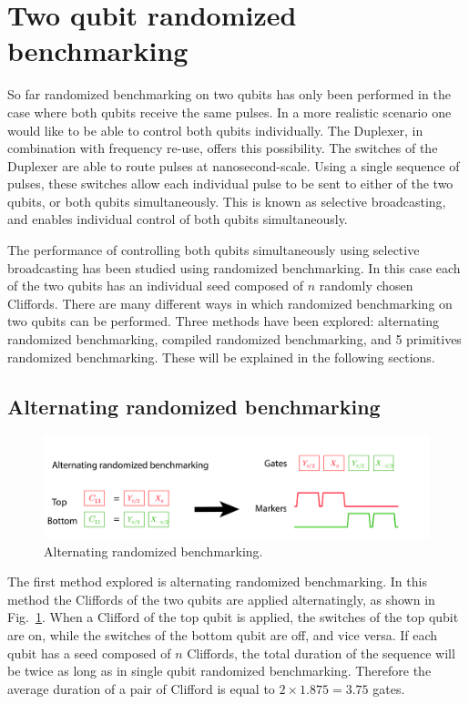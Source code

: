     \section{Two qubit randomized benchmarking}
      \label{Two qubit randomized benchmarking}
      So far randomized benchmarking on two qubits has only been performed in the case where both qubits receive the same pulses. In a more realistic scenario one would like to be able to control both qubits individually. The Duplexer, in combination with frequency re-use, offers this possibility. The switches of the Duplexer are able to route pulses at nanosecond-scale. Using a single sequence of pulses, these switches allow each individual pulse to be sent to either of the two qubits, or both qubits simultaneously. This is known as selective broadcasting, and enables individual control of both qubits simultaneously.

      The performance of controlling both qubits simultaneously using selective broadcasting has been studied using randomized benchmarking. In this case each of the two qubits has an individual seed composed of $n$ randomly chosen Cliffords. There are many different ways in which randomized benchmarking on two qubits can be performed. Three methods have been explored: alternating randomized benchmarking, compiled randomized benchmarking, and 5 primitives randomized benchmarking. These will be explained in the following sections.

      \subsection{Alternating randomized benchmarking}
        \label{ssec:alternating randomized benchmarking}

        \begin{figure}[h]
          \centering
          \includegraphics[width=\textwidth]{Figures/Randomized benchmarking/alternating RB.jpg}
          \caption{Alternating randomized benchmarking.}
          \label{fig:alternating RB schematic}
        \end{figure}

        The first method explored is alternating randomized benchmarking. In this method the Cliffords of the two qubits are applied alternatingly, as shown in Fig.~\ref{fig:alternating RB schematic}. When a Clifford of the top qubit is applied, the switches of the top qubit are on, while the switches of the bottom qubit are off, and vice versa. If each qubit has a seed composed of $n$ Cliffords, the total duration of the sequence will be twice as long as in single qubit randomized benchmarking. Therefore the average duration of a pair of Clifford is equal to $2 \times 1.875 = 3.75$ gates.


